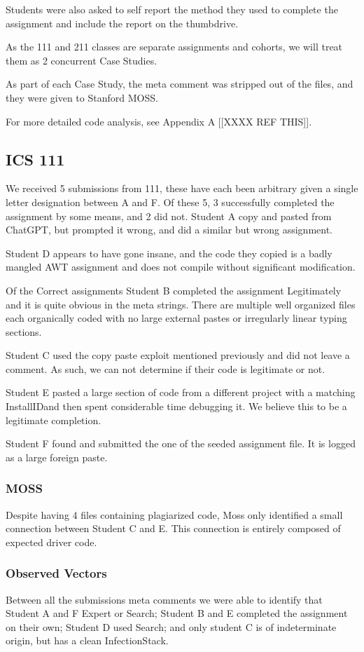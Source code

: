 \documentclass[conference]{IEEEtran}
\newcommand{\n}{\hfill\break}
\newcommand{\installID}{InstallID}
\newcommand{\infectionStack}{InfectionStack}
\begin{document}
Students were also asked to self report the method they used to complete the assignment and include the report on the thumbdrive.

As the 111 and 211 classes are separate assignments and cohorts, we will treat them as 2 concurrent Case Studies. 

As part of each Case Study, the meta comment was stripped out of the files, and they were given to Stanford MOSS.

For more detailed code analysis, see Appendix A [[XXXX REF THIS]].
\subsection{\textbf{ICS 111}}
We received 5 submissions from 111, these have each been arbitrary given a single letter designation between A and F.  Of these 5, 3 successfully completed the assignment by some means, and 2 did not.  Student A copy and pasted from ChatGPT, but prompted it wrong, and did a similar but wrong assignment.  

Student D appears to have gone insane, and the code they copied is a badly mangled AWT assignment and does not compile without significant modification.

Of the Correct assignments Student B completed the assignment Legitimately and it is quite obvious in the meta strings.  There are multiple well organized files each organically coded with no large external pastes or irregularly linear typing sections.

Student C used the copy paste exploit mentioned previously and did not leave a comment.  As such, we can not determine if their code is legitimate or not.

Student E pasted a large section of code from a different project with a matching \installID and then spent considerable time debugging it.  We believe this to be a legitimate completion.

Student F found and submitted the one of the seeded assignment file.  It is logged as a large foreign paste.

\n\subsubsection*{\textbf{MOSS}}\hfill\break\indent
Despite having 4 files containing plagiarized code, Moss only identified a small connection between Student C and E.  This connection is entirely composed of expected driver code. 
\n\subsubsection*{\textbf{Observed Vectors}}\hfill\break\indent
Between all the submissions meta comments we were able to identify that Student A and F Expert or Search; Student B and E completed the assignment on their own; Student D used Search; and only student C is of indeterminate origin, but has a clean \infectionStack.
\end{document}
